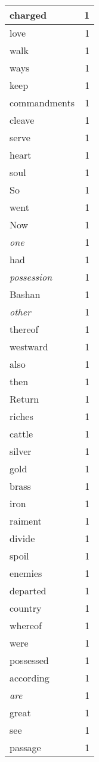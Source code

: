 \begin{center}
\begin{longtable}{l|r}
charged & 1\\ \hline 
love & 1\\ \hline 
walk & 1\\ \hline 
ways & 1\\ \hline 
keep & 1\\ \hline 
commandments & 1\\ \hline 
cleave & 1\\ \hline 
serve & 1\\ \hline 
heart & 1\\ \hline 
soul & 1\\ \hline 
So & 1\\ \hline 
went & 1\\ \hline 
Now & 1\\ \hline 
\emph{one} & 1\\ \hline 
had & 1\\ \hline 
\emph{possession} & 1\\ \hline 
Bashan & 1\\ \hline 
\emph{other} & 1\\ \hline 
thereof & 1\\ \hline 
westward & 1\\ \hline 
also & 1\\ \hline 
then & 1\\ \hline 
Return & 1\\ \hline 
riches & 1\\ \hline 
cattle & 1\\ \hline 
silver & 1\\ \hline 
gold & 1\\ \hline 
brass & 1\\ \hline 
iron & 1\\ \hline 
raiment & 1\\ \hline 
divide & 1\\ \hline 
spoil & 1\\ \hline 
enemies & 1\\ \hline 
departed & 1\\ \hline 
country & 1\\ \hline 
whereof & 1\\ \hline 
were & 1\\ \hline 
possessed & 1\\ \hline 
according & 1\\ \hline 
\emph{are} & 1\\ \hline 
great & 1\\ \hline 
see & 1\\ \hline 
passage & 1\\ \hline 

\end{longtable}
\end{center}

